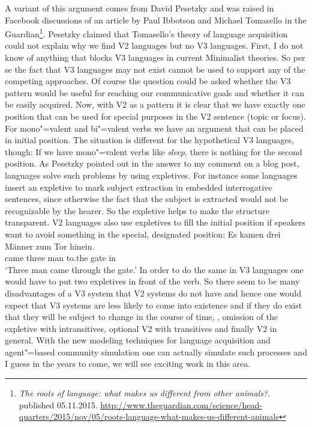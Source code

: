 A variant of this argument comes from David Pesetzky and was raised in Facebook discussions of an
article by Paul Ibbotson and Michael Tomasello in the Guardian\footnote{
\emph{The roots of language: what makes us different from other animals?}. published 05.11.2015. \url{http://www.theguardian.com/science/head-quarters/2015/nov/05/roots-language-what-makes-us-different-animals}
}. 
Pesetzky claimed that Tomasello's theory of language
acquisition could not explain why we find V2 languages but no V3 languages. First, I do not know of
anything that blocks V3 languages in current Minimalist theories. So per se the fact that V3
languages may not exist cannot be used to support any of the competing approaches. Of course the
question could be asked whether the V3 pattern would be useful for reaching our communicative goals
and whether it can be easily acquired. Now, with V2 as a pattern it is clear that we have exactly
one position that can be used for special purposes in the V2 sentence (topic or focus). For mono"=valent and bi"=valent verbs we
have an argument that can be placed in initial position. The situation is different for the
hypothetical V3 languages, though: If we have mono"=valent verbs like \emph{sleep}, there is nothing
for the second position. As Pesetzky pointed out in the answer to my comment on a blog post, languages solve such
problems by using expletives. For instance some languages insert an expletive to mark subject
extraction in embedded interrogative sentences, since otherwise the fact that the subject is
extracted would not be recognizable by the hearer. So the expletive helps to make the structure
transparent. V2 languages also use expletives to fill the initial position if speakers want to avoid
something in the special, designated position:
\ea
\gll Es kamen drei Männer zum Tor hinein.\\
     \expl{} came three man to.the gate in\\
\glt `Three man came through the gate.'
\z
In order to do the same in V3 languages one would have to put two expletives in front of the
verb. So there seem to be many disadvantages of a V3 system that V2 systems do not have and hence
one would expect that V3 systems are less likely to come into existence and if they do exist that
they will be subject to change in the course of time, \eg, omission of the expletive with
intransitives, optional V2 with transitives and finally V2 in general. With the new modeling
techniques for language acquisition and agent"=based community simulation one can actually simulate
such processes and I guess in the years to come, we will see exciting work in this area. 

